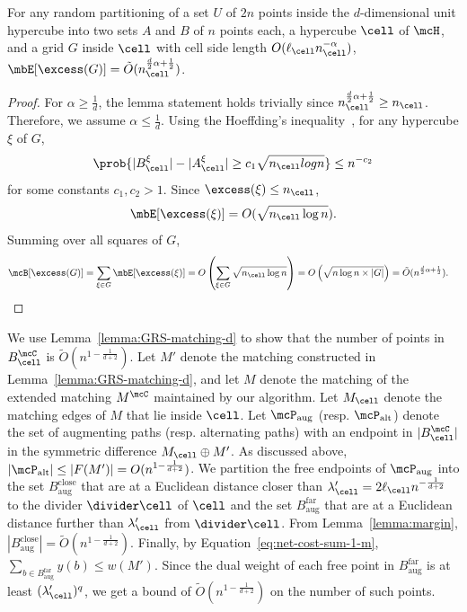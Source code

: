 \begin{lemma}\label{lemma:convergence_excess-d}
    For any random partitioning of a set $U$ of $2n$ points inside the $d$-dimensional unit hypercube into two sets $A$ and $B$ of $n$ points each, a hypercube $\cell$ of $\mcH$, and a grid $G$ inside $\cell$ with cell side length $O(\ell_\cell n_\cell^{-\alpha})$, $\mbE[\excess(G)]= \tilde{O}(n_\cell^{\frac{d}{2}\alpha + \frac{1}{2}})$. 
\end{lemma}
\begin{proof}
    For $\alpha\ge \frac{1}{d}$, the lemma statement holds trivially since $n_\cell^{\frac{d}{2}\alpha+\frac{1}{2}} \ge n_\cell$. Therefore, we assume $\alpha\le \frac{1}{d}$.
    Using the Hoeffding\textquoteright{}s inequality~\cite{hoeffding1994probability}, for any hypercube $\xi$ of $G$,
    \begin{equation*}
        \prob{|B_\cell^\xi| - |A_\cell^\xi|\ge c_1\sqrt{n_\cell log n}}\le n^{-c_2}\label{eq:excess-d}
    \end{equation*}
    for some constants $c_1, c_2 > 1$. Since $\excess(\xi)\le n_\cell$, 
    \begin{equation*}
        \mbE[\excess(\xi)]= O(\sqrt{n_\cell\log n}).
    \end{equation*}
    Summing over all squares of $G$,
    \begin{align*}
        \mcB[\excess(G)] = \sum_{\xi\in G} \mbE[\excess(\xi)] &=O\left(\sum_{\xi\in G} \sqrt{n_\cell\log n}\right) = O\left(\sqrt{n\log n\times |G|}\right) = \tilde{O}(n^{\frac{d}{2}\alpha+\frac{1}{2}}).\label{eq:excess-dense-d}
    \end{align*}
\end{proof}


We use Lemma~\ref{lemma:GRS-matching-d} to show that the number of points in $B_\cell^\mcC$ is $\tilde{O}(n^{1-\frac{1}{d+2}})$. Let $M'$ denote the matching constructed in Lemma~\ref{lemma:GRS-matching-d}, and let $M$ denote the matching of the extended matching $M^\mcC$ maintained by our algorithm. Let $M_\cell$ denote the matching edges of $M$ that lie inside $\cell$. 
Let $\mcP_{\mathrm{aug}}$ (resp. $\mcP_{\mathrm{alt}}$) denote the set of augmenting paths (resp. alternating paths) with an endpoint in $|B_\cell^\mcC|$ in the symmetric difference $M_\cell\oplus M'$.
As discussed above, $|\mcP_{\mathrm{alt}}|\le |F(M')|=O(n^{1-\frac{1}{d+2}})$. 
We partition the free endpoints of $\mcP_{\mathrm{aug}}$ into the set $B^{\mathrm{close}}_{\mathrm{aug}}$ that are at a Euclidean distance closer than $\lambda'_\cell=2\ell_\cell n^{-\frac{1}{d+2}}$ to the divider $\divider\cell$ of $\cell$ and the set $B^{\mathrm{far}}_{\mathrm{aug}}$ that are at a Euclidean distance further than $\lambda'_\cell$ from $\divider\cell$. From Lemma~\ref{lemma:margin},  $|B^{\mathrm{close}}_{\mathrm{aug}}|=\tilde{O}(n^{1-\frac{1}{d+2}})$. Finally, by Equation~\eqref{eq:net-cost-sum-1-m}, $\sum_{b\in B^{\mathrm{far}}_{\mathrm{aug}}}y(b) \le w(M')$. Since the dual weight of each free point in $B^{\mathrm{far}}_{\mathrm{aug}}$ is at least $(\lambda'_\cell)^q$, we get a bound of $\tilde{O}(n^{1-\frac{1}{d+2}})$ on the number of such points. 

